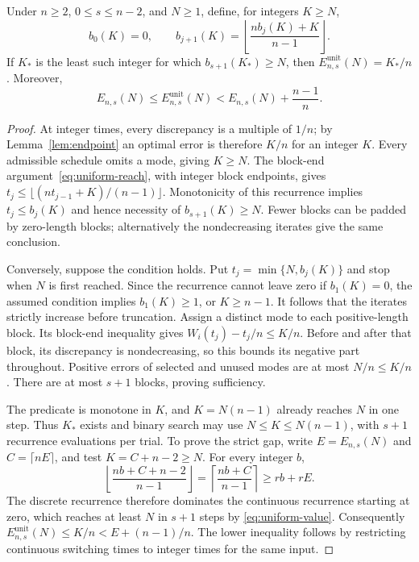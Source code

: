 \begin{theorem}\label{thm:uniform-grid}
Under $n\ge2$, $0\le s\le n-2$, and $N\ge1$, define, for integers $K\ge N$,
\begin{equation}\label{eq:uniform-grid-recurrence}
 b_0(K)=0,\qquad
 b_{j+1}(K)=\left\lfloor\frac{n b_j(K)+K}{n-1}\right\rfloor.
\end{equation}
If $K_*$ is the least such integer for which $b_{s+1}(K_*)\ge N$, then
$E^{\mathrm{unit}}_{n,s}(N)=K_*/n$. Moreover,
\begin{equation}\label{eq:uniform-grid-gap}
 E_{n,s}(N)\le E^{\mathrm{unit}}_{n,s}(N)
 <E_{n,s}(N)+\frac{n-1}{n}.
\end{equation}
\end{theorem}
\begin{proof}
At integer times, every discrepancy is a multiple of $1/n$; by
Lemma~\ref{lem:endpoint} an optimal error is therefore $K/n$ for an integer
$K$. Every admissible schedule omits a mode, giving $K\ge N$.
The block-end argument~\eqref{eq:uniform-reach}, with integer block endpoints,
gives
$t_j\le\lfloor (n t_{j-1}+K)/(n-1)\rfloor$.
Monotonicity of this recurrence implies $t_j\le b_j(K)$ and hence necessity
of $b_{s+1}(K)\ge N$. Fewer blocks can be padded by zero-length blocks;
alternatively the nondecreasing iterates give the same conclusion.

Conversely, suppose the condition holds. Put $t_j=\min\{N,b_j(K)\}$ and
stop when $N$ is first reached. Since the recurrence cannot leave zero if
$b_1(K)=0$, the assumed condition implies $b_1(K)\ge1$, or $K\ge n-1$.
It follows that the iterates strictly increase before truncation. Assign a
distinct mode to each positive-length block. Its block-end inequality gives
$W_i(t_j)-t_j/n\le K/n$. Before and after that block, its discrepancy is
nondecreasing, so this bounds its negative part throughout. Positive
errors of selected and unused modes are at most $N/n\le K/n$. There are
at most $s+1$ blocks, proving sufficiency.

The predicate is monotone in $K$, and $K=N(n-1)$ already reaches $N$ in
one step. Thus $K_*$ exists and binary search may use
$N\le K\le N(n-1)$, with $s+1$ recurrence evaluations per trial.
To prove the strict gap, write $E=E_{n,s}(N)$ and
$C=\lceil nE\rceil$, and test $K=C+n-2\ge N$. For every integer $b$,
\[
 \left\lfloor\frac{nb+C+n-2}{n-1}\right\rfloor
 =\left\lceil\frac{nb+C}{n-1}\right\rceil
 \ge r b+rE.
\]
The discrete recurrence therefore dominates the continuous recurrence
starting at zero, which reaches at least $N$ in $s+1$ steps by
\eqref{eq:uniform-value}. Consequently
$E^{\mathrm{unit}}_{n,s}(N)\le K/n<E+(n-1)/n$.
The lower inequality follows by restricting continuous switching times to
integer times for the same input.
\end{proof}

